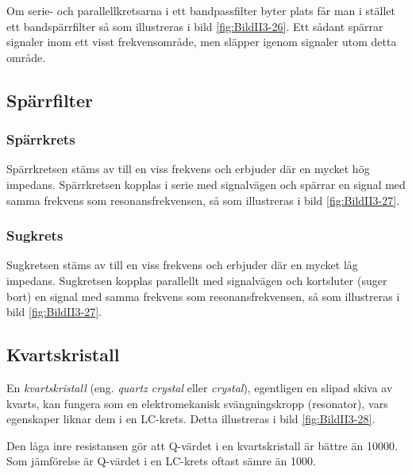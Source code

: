 Om serie- och parallellkretsarna i ett bandpassfilter byter plats får man
i stället ett bandspärrfilter så som illustreras i bild \ref{fig:BildII3-26}.
Ett sådant spärrar signaler inom ett visst frekvensområde, men släpper igenom
signaler utom detta område.

\subsection{Spärrfilter}


\subsubsection{Spärrkrets}
Spärrkretsen stäms av till en viss frekvens och erbjuder där en mycket hög
impedans.
Spärrkretsen kopplas i serie med signalvägen och spärrar en signal med samma
frekvens som resonansfrekvensen, så som illustreras i bild \ref{fig:BildII3-27}.

\subsubsection{Sugkrets}
Sugkretsen stäms av till en viss frekvens och erbjuder där en mycket låg
impedans.
Sugkretsen kopplas parallellt med signalvägen och kortsluter (suger bort) en
signal med samma frekvens som resonansfrekvensen, så som illustreras i bild
\ref{fig:BildII3-27}.

\subsection{Kvartskristall}



En \emph{kvartskristall} (eng. \emph{quartz crystal} eller \emph{crystal}),
egentligen en slipad skiva av kvarts, kan fungera som en
elektromekanisk svängningskropp (resonator), vars egenskaper liknar dem i en
LC-krets.
Detta illustreras i bild \ref{fig:BildII3-28}.

Den låga inre resistansen gör att Q-värdet i en kvartskristall är bättre än
10000.
Som jämförelse är Q-värdet i en LC-krets oftast sämre än 1000.

